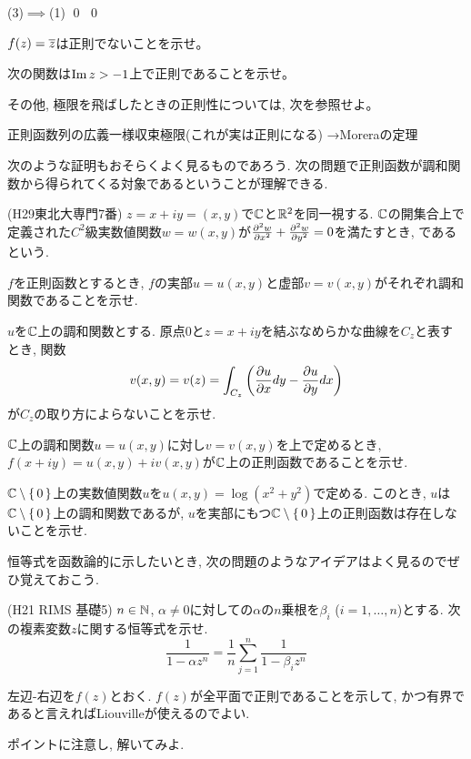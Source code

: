 (3)$\implies$(1) \qed
\qed

\begin{prac}
$f(z) = \overline{z}$は正則でないことを示せ。
\end{prac}

\begin{egprob}
次の関数は$\mathrm{Im}\,z > -1$上で正則であることを示せ。
\end{egprob}



その他, 極限を飛ばしたときの正則性については, 次を参照せよ。
\ben
\item 正則函数列の広義一様収束極限(これが実は正則になる) →Moreraの定理
\een


次のような証明もおそらくよく見るものであろう. 次の問題で正則函数が調和関数から得られてくる対象であるということが理解できる.
\begin{egprob} (H29東北大専門7番)
$z=x+iy=(x,y)$で$\mathbb{C}$と$\mathbb{R}^2$を同一視する. $\mathbb{C}$の開集合上で定義された$C^2$級実数値関数$w=w(x,y)$が$\frac{\partial^2 w}{\partial x^2} + \frac{\partial^2 w}{\partial y^2} = 0$を満たすとき, であるという.
\ben
\item $f$を正則函数とするとき, $f$の実部$u=u(x,y)$と虚部$v=v(x,y)$がそれぞれ調和関数であることを示せ.
\item $u$を$\mathbb{C}$上の調和関数とする. 原点$0$と$z=x+iy$を結ぶなめらかな曲線を$C_z$と表すとき, 関数
\[v(x,y) = v(z) = \int_{C_z} \left( \frac{\partial u}{\partial x} dy - \frac{\partial u }{\partial y} dx \right)\]
が$C_z$の取り方によらないことを示せ.
\item $\mathbb{C}$上の調和関数$u=u(x,y)$に対し$v=v(x,y)$を上で定めるとき, $f(x+iy) = u(x,y) + iv(x,y)$が$\mathbb{C}$上の正則函数であることを示せ.
\item $\mathbb{C}\setminus{\set{0}}$上の実数値関数$u$を$u(x,y) = \log{(x^2+y^2)}$で定める. このとき, $u$は$\mathbb{C}\setminus{\set{0}}$上の調和関数であるが, $u$を実部にもつ$\mathbb{C}\setminus{\set{0}}$上の正則函数は存在しないことを示せ.
\een
\end{egprob}

恒等式を函数論的に示したいとき, 次の問題のようなアイデアはよく見るのでぜひ覚えておこう.
\begin{egprob} (H21 RIMS 基礎5)
$n\in\mathbb{N}$, $\alpha\neq 0$に対しての$\alpha$の$n$乗根を$\beta_i$ ($i=1,\dots, n$)とする. 次の複素変数$z$に関する恒等式を示せ.
\[\dfrac{1}{1-\alpha z^n} = \dfrac{1}{n} \sum_{j=1}^{n} \dfrac{1}{1-\beta_i z^n}\]
\end{egprob}
\begin{point}
左辺-右辺を$f(z)$とおく. $f(z)$が全平面で正則であることを示して, かつ有界であると言えればLiouvilleが使えるのでよい.
\end{point}
\begin{prac}
ポイントに注意し, 解いてみよ.
\end{prac}



